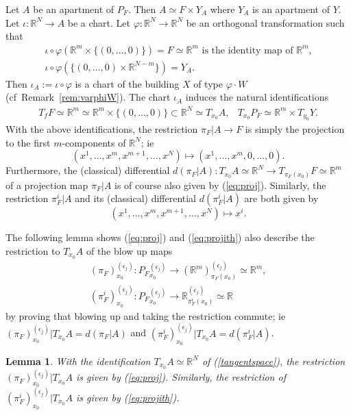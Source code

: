 \documentclass[12pt]{amsart}
\newtheorem{lemma}[theorem]{Lemma}
\theoremstyle{definition}
\numberwithin{equation}{section}
\newcommand{\R}{\mathbb R}
\newcommand{\ee}{{(\epsilon_j)}}
\newcommand{\PF}{P_F}
\begin{document}
Let $A$ be an apartment of $\PF$.  Then $A\simeq F \times Y_A$ where $Y_A$ is an apartment of $Y$.   Let $\iota:\R^N \rightarrow A$ be a chart.  Let $\varphi:\R^N \rightarrow \R^N$ be an orthogonal transformation such that 
\begin{equation} \label{otchoice}
\begin{array}{l}
\iota \circ \varphi (\R^m \times \{(0, \dots, 0)\}) =F \simeq \R^m \mbox{ is the identity map of $\R^m$,}\\
\iota \circ \varphi(\{(0, \dots, 0) \times \R^{N-m}\})=Y_A.
\end{array}
\end{equation}
Then $\iota_A:=\iota \circ \varphi$ is a chart of the building $X$ of type $\varphi \cdot W$ (cf~Remark~\ref{rem:varphiW}).  
The chart $\iota_A$ induces the natural identifications
\begin{eqnarray} \label{tangentspace}
T_fF \simeq \R^m\simeq \R^m \times \{(0,\dots,0)\} \subset  \R^N \simeq   T_{x_0}A, & 
T_{x_0} \PF \simeq \R^m \times T_{y_0}Y.
\end{eqnarray}
With the above identifications, the restriction 
$
\pi_F|A \rightarrow F
$
 is simply the projection to the first $m$-components of $\R^N$; ie
 \begin{equation} \label{eq:proj}
 (x^1, \dots, x^m, x^{m+1}, \dots, x^N) \mapsto (x^1, \dots, x^m, 0, \dots, 0).
 \end{equation}
Furthermore, the (classical) differential $d(\pi_F|A): T_{x_0}A \simeq \R^N \rightarrow T_{\pi_F(x_0)}F \simeq \R^m$ of a projection map $\pi_F|A$  is of course also given by  (\ref{eq:proj}).
Similarly,  the restriction $\pi_F^i|A$ and its (classical)  differential $d(\pi_F^i|A)$ are both given by 
 \begin{equation} \label{eq:projith}
 (x^1, \dots, x^m, x^{m+1}, \dots, x^N) \mapsto  x^i.
 \end{equation}


The following lemma shows (\ref{eq:proj}) and (\ref{eq:projith}) also describe the restriction to $T_{x_0}A$ of the blow up maps 
\begin{eqnarray*}
(\pi_F)_{x_0}^{(\epsilon_j)}:{\PF}_{ x_0}^\ee \rightarrow (\R^m)_{\pi_F(x_0)}^\ee \simeq \R^m,
\\
(\pi_F^i)_{x_0}^{(\epsilon_j)}:{\PF}_{ x_0}^\ee \rightarrow \R_{\pi_F^i(x_0)}^\ee \simeq \R \ \ \ \ \ \ \ \,
\end{eqnarray*} 
 by proving that blowing up and taking the restriction commute; ie~$(\pi_F)_{x_0}^\ee |T_{x_0}A= d(\pi_F|A)$ and $(\pi_F^i)_{x_0}^\ee|T_{x_0}A = d(\pi_F^i|A)$.
\begin{lemma} \label{lem:rest}
With the identification $T_{x_0}A \simeq \R^N$ of (\ref{tangentspace}), the restriction $(\pi_F)_{x_0}^{(\epsilon_j)}\big|T_{x_0}A$ is given by (\ref{eq:proj}).  Similarly, the restriction of $(\pi_F^i)_{x_0}^{(\epsilon_j)}\big|T_{x_0}A$ is given by (\ref{eq:projith}).
\end{lemma}
\end{document}
